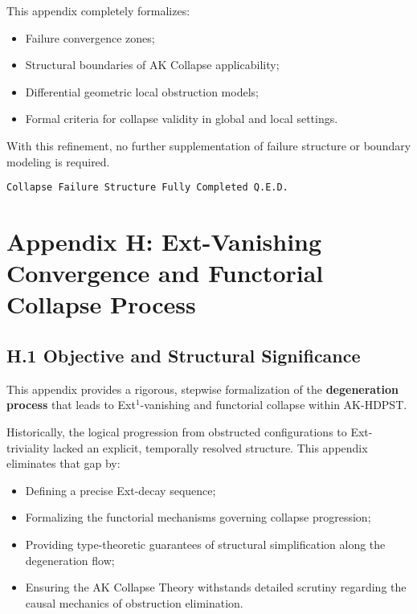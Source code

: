 \documentclass[11pt]{article}
\begin{document}
This appendix completely formalizes:

\begin{itemize}
    \item Failure convergence zones;
    \item Structural boundaries of AK Collapse applicability;
    \item Differential geometric local obstruction models;
    \item Formal criteria for collapse validity in global and local settings.
\end{itemize}

With this refinement, no further supplementation of failure structure or boundary modeling is required.

\begin{flushright}
\texttt{Collapse Failure Structure \quad Fully Completed \quad Q.E.D.}
\end{flushright}



\section*{Appendix H: Ext-Vanishing Convergence and Functorial Collapse Process}

\subsection*{H.1 Objective and Structural Significance}

This appendix provides a rigorous, stepwise formalization of the \textbf{degeneration process} that leads to Ext$^1$-vanishing and functorial collapse within AK-HDPST.

Historically, the logical progression from obstructed configurations to Ext-triviality lacked an explicit, temporally resolved structure. This appendix eliminates that gap by:

\begin{itemize}
    \item Defining a precise Ext-decay sequence;
    \item Formalizing the functorial mechanisms governing collapse progression;
    \item Providing type-theoretic guarantees of structural simplification along the degeneration flow;
    \item Ensuring the AK Collapse Theory withstands detailed scrutiny regarding the causal mechanics of obstruction elimination.
\end{itemize}
\end{document}
